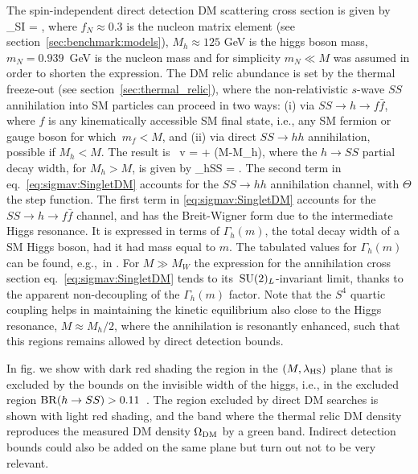 The spin-independent direct detection DM scattering cross section is given by~\cite{ScalarSinglet}
\beq\label{eq:f} \sigma_{\rm SI}
= , 
\eeq
where $f_N\approx 0.3$
is the nucleon matrix element 
(see section~\ref{sec:benchmark:models}),
$M_h \approx 125$ GeV is the higgs boson mass,
$m_N=0.939$~GeV is the nucleon mass
and  for simplicity $m_N \ll M$ was assumed in order to shorten the expression.
The DM relic abundance is set by the thermal freeze-out (see section~\ref{sec:thermal_relic}), where
the non-relativistic $s$-wave $SS$ annihilation into SM particles can proceed in two ways: (i) via $SS\to h\to f \bar f$, where $f$ is any kinematically accessible SM final state, i.e., any SM fermion or gauge boson for which~$m_f < M$, and (ii) via direct $SS \to hh$ annihilation, possible if $M_h < M$.
The result is~\cite{ScalarSinglet}
\beq
\label{eq:sigmav:SingletDM}
\sigma v =  
+  \Theta(M-M_h),
\eeq
where the $h\to SS$ partial decay width, for $M_h>M$, is given by
\beq
\Gamma_{h\to SS} = .
\eeq 
The second term in eq.~\eqref{eq:sigmav:SingletDM} accounts for the  $SS \to hh$ annihilation channel, with $\Theta$ the step function. The first term in \eqref{eq:sigmav:SingletDM} accounts for the $SS\to h\to f \bar f$ channel, and has the Breit-Wigner form due to the intermediate Higgs  resonance. It is expressed in terms of $\Gamma_h(m)$, the total decay width of a SM Higgs boson, had it had mass equal to $m$. The tabulated values for $\Gamma_h(m)$ can be found, e.g.,~in \cite{hdecaywidth}.
For $M\gg M_W$ the expression for the annihilation cross section eq.~\eqref{eq:sigmav:SingletDM}
 tends to its $\,{\rm SU}(2)_L$-invariant limit, thanks to the apparent non-decoupling of the $\Gamma_h(m)$ factor. 
Note that the $S^4$ quartic coupling helps in maintaining the kinetic equilibrium also close to the Higgs resonance, $M \approx M_h/2$, where the annihilation is resonantly enhanced,
such that this regions remains allowed by direct detection bounds.


In fig. we show with dark red shading
the region in the $(M,\lambda_{\rm HS})$ plane  that is excluded by the bounds on the invisible width of the higgs, i.e., in the excluded region ${\rm BR}(h\to SS)>0.11$~\cite{htoinvisibles}. 
The region excluded by direct DM searches is shown with light red shading, 
and the band where the thermal relic DM density reproduces the measured DM density $\Omega_{\rm DM}$ by a green band.
Indirect detection bounds could also be added on the same plane but turn out not to be very relevant.

